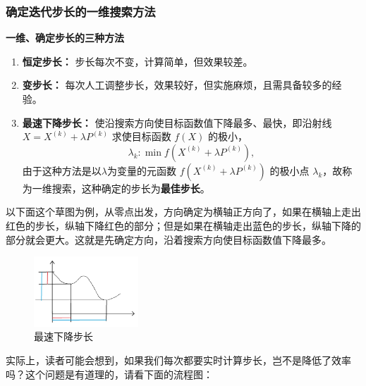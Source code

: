 \subsubsection{确定迭代步长的一维搜索方法}
\label{确定迭代步长的一维搜索方法}
\begin{notebox}{\textbf{一维、确定步长的三种方法}}
    \begin{enumerate}
        \item \textbf{恒定步长：} 步长每次不变，计算简单，但效果较差。

        \item \textbf{变步长：} 每次人工调整步长，效果较好，但实施麻烦，且需具备较多的经验。

        \item \textbf{最速下降步长：} 使沿搜索方向使目标函数值下降最多、最快，即沿射线 $X = X^{(k)} + \lambda P^{(k)}$ 求使目标函数 $f(X)$ 的极小，
        \[
        \lambda_k : \min f(X^{(k)} + \lambda P^{(k)}),
        \]
        由于这种方法是以$\lambda$为变量的元函数 $f(X^{(k)} + \lambda P^{(k)})$ 的极小点 $\lambda_k$，故称为一维搜索，这种确定的步长为\textbf{最佳步长}。
    \end{enumerate}
\end{notebox}
以下面这个草图为例，从零点出发，方向确定为横轴正方向了，如果在横轴上走出红色的步长，纵轴下降红色的部分；但是如果在横轴走出蓝色的步长，纵轴下降的部分就会更大。这就是先确定方向，沿着搜索方向使目标函数值下降最多。
\begin{figure}[H]
    \centering
    \includegraphics[width=0.35\textwidth]{./image/22.png}
    \caption{最速下降步长}
    \label{fig:Chapter4_Temporary_Pavilion_1}
\end{figure}
实际上，读者可能会想到，如果我们每次都要实时计算步长，岂不是降低了效率吗？这个问题是有道理的，请看下面的流程图：
